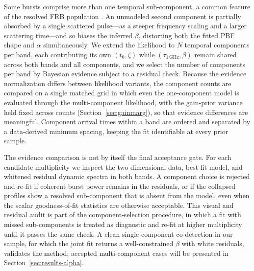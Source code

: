 Some bursts comprise more than one temporal sub-component, a common feature of
the resolved FRB population \citep{Hessels2019, Pleunis2021}. An unmodeled
second component is partially absorbed by a single scattered pulse---as a steeper
frequency scaling and a larger scattering time---and so biases the inferred
$\beta$, distorting both the fitted PBF shape and $\alpha$ simultaneously. We
extend the likelihood to $N$ temporal components per band, each contributing its
own $(t_0,\zeta)$ while $(\tau_{1\,\mathrm{GHz}},\beta)$ remain shared across
both bands and all components, and we select the number of components per band
by Bayesian evidence subject to a residual check. Because the evidence
normalization differs between
likelihood variants, the component counts are compared on a single matched grid
in which even the one-component model is evaluated through the multi-component
likelihood, with the gain-prior variance held fixed across counts
(Section~\ref{sec:gainmarg}), so that evidence differences are meaningful.
Component arrival times
within a band are ordered and separated by a data-derived minimum spacing,
keeping the fit identifiable at every prior sample.

The evidence comparison is not by itself the final acceptance gate. For each
candidate multiplicity we inspect the two-dimensional data, best-fit model, and
whitened residual dynamic spectra in both bands. A component choice is rejected
and re-fit if coherent burst power remains in the residuals, or if the collapsed
profiles show a resolved sub-component that is absent from the model, even when
the scalar goodness-of-fit statistics are otherwise acceptable. This visual and
residual audit is part of the component-selection procedure, in which a fit with
missed sub-components is treated as diagnostic and re-fit at higher multiplicity
until it passes the same check. A clean single-component co-detection in our sample,
for which the joint fit returns a well-constrained $\beta$ with white residuals,
validates the method; accepted multi-component cases will be presented in
Section~\ref{sec:results-alpha}.
